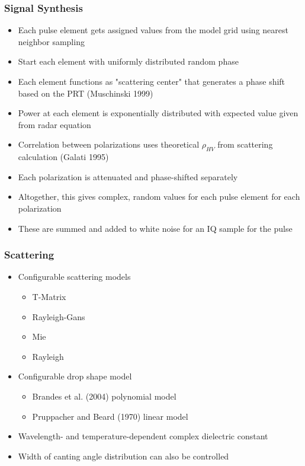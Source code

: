 \documentclass[red]{beamer}
\begin{document}
\begin{frame}[<+->]
	\frametitle{Signal Synthesis}
	\begin{itemize}
		\item Each pulse element gets assigned values from the model grid using nearest
		neighbor sampling
		\item Start each element with uniformly distributed random phase
		\item Each element functions as "scattering center" that generates
		a phase shift based on the PRT (Muschinski 1999)
		\item Power at each element is exponentially distributed with expected value
		given from radar equation
		\item Correlation between polarizations uses theoretical $\rho_{HV}$ from scattering calculation (Galati 1995)
		\item Each polarization is attenuated and phase-shifted separately
		\item Altogether, this gives complex, random values for each pulse element for 
		each polarization
		\item These are summed and added to white noise for an IQ sample for the pulse
	\end{itemize}
\end{frame}

\begin{frame}
	\frametitle{Scattering}
	\begin{itemize}
		\item Configurable scattering models
		\begin{itemize}
			\item T-Matrix
			\item Rayleigh-Gans
			\item Mie
			\item Rayleigh
			\end{itemize}
		\item Configurable drop shape model
		\begin{itemize}
			\item Brandes et al. (2004) polynomial model
			\item Pruppacher and Beard (1970) linear model
			\end{itemize}
		\item Wavelength- and temperature-dependent complex dielectric constant
		\item Width of canting angle distribution can also be controlled
	\end{itemize}
\end{frame}
\end{document}
